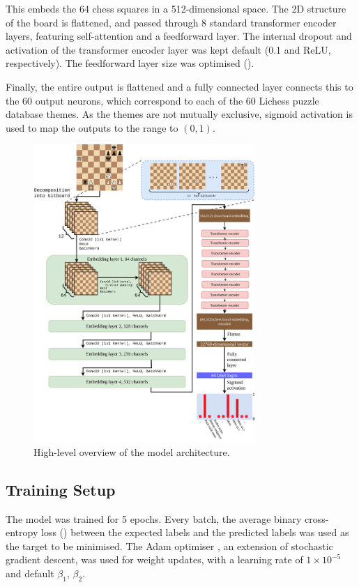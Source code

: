 This embeds the 64 chess squares in a 512-dimensional space. The 2D structure
of the board is flattened, and passed through 8 standard transformer encoder
\citep{attention} layers, featuring self-attention and a feedforward layer. The
internal dropout and activation of the transformer encoder layer was kept
default (0.1 and ReLU, respectively). The feedforward layer size was optimised
().

Finally, the entire output is flattened and a fully connected layer connects
this to the 60 output neurons, which correspond to each of the 60 Lichess
puzzle database themes. As the themes are not mutually exclusive, sigmoid
activation is used to map the outputs to the range to $(0, 1)$.


\begin{figure}[H]
  \centering
  \includegraphics[width=0.75\textwidth]{project/img/ml_diagram.png}
  \caption{High-level overview of the model architecture.}
  \label{MLDiagram}
\end{figure}

\subsection{Training Setup}\label{mlS23}

The model was trained for 5 epochs. Every batch, the average binary
cross-entropy loss () between the expected labels and the predicted
labels was used as the target to be minimised. The Adam optimiser
\citep{kingma2014adam}, an extension of stochastic gradient descent, was used
for weight updates, with a learning rate of $1\times10^{-5}$ and default
$\beta_1$, $\beta_2$.

